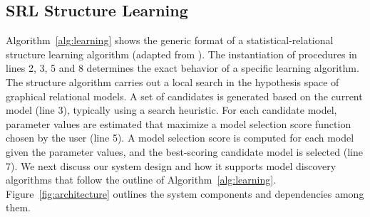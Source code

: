 \subsection{SRL Structure Learning}

Algorithm~\ref{alg:learning} shows the generic format of a statistical-relational structure learning algorithm (adapted from 
\cite{Kimmig2015}%
). The instantiation of procedures in lines 2, 3, 5 and 8 determines the exact behavior of a specific learning algorithm. The structure algorithm carries out a local search in the hypothesis space of graphical relational models. A set of candidates is generated based on the current model (line 3), typically using a search heuristic. For each candidate model, parameter values are estimated that maximize a model selection score function chosen by the  user (line 5). A model selection score is computed for each model given the parameter values, and the best-scoring candidate model is selected (line 7). 
We next discuss our system design and how it supports model discovery algorithms that follow the outline of Algorithm~\ref{alg:learning}. Figure~\ref{fig:architecture} outlines the system components and dependencies among them.

%
%
%

